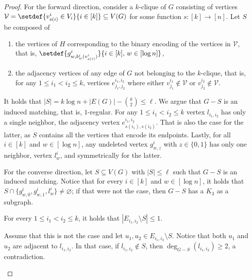 \begin{proof}
    For the forward direction, consider a $k$-clique of $G$ consisting of vertices
    $\mathcal{V} = \setdef{v^i_{s(i)} \in V_i}{i \in [k]} \subseteq V(G)$
    for some function $s \colon [k] \to [n]$.
    Let $S$ be composed of
    \begin{enumerate}
        \item the vertices of $H$ corresponding
        to the binary encoding of the vertices in $\mathcal{V}$,
        that is, $\setdef{g^i_{w,b^i_w(v^i_{s(i)})}}{i \in [k], \, w \in [\log n]}$,
        \item the adjacency vertices of any edge of $G$ not belonging to the $k$-clique,
        that is, for any $1 \le i_1 < i_2 \le k$,
        vertices $e^{i_1,i_2}_{j_1,j_2}$ where either $v^{i_1}_{j_1} \notin \mathcal{V}$ or $v^{i_2}_{j_2} \notin \mathcal{V}$.
    \end{enumerate}
    It holds that $|S| = k \log n + |E(G)| - \binom{k}{2} \le \ell$.
    We argue that $G-S$ is an induced matching,
    that is, $1$-regular.
    For any $1 \le i_1 < i_2 \le k$ vertex $l_{i_1,i_2}$ has only a single neighbor,
    the adjacency vertex $e^{i_1,i_2}_{s(i_1),s(i_2)}$.
    That is also the case for the latter, as $S$ contains all the vertices that encode its endpoints.
    Lastly, for all $i \in [k]$ and $w \in [\log n]$,
    any undeleted vertex $g^i_{w,z}$ with $z \in \{ 0,1 \}$ has only one neighbor,
    vertex $l^i_w$, and symmetrically for the latter.

    For the converse direction, let $S \subseteq V(G)$ with $|S| \le \ell$ such that $G-S$ is an induced matching.
    Notice that for every $i \in [k]$ and $w \in [\log n]$,
    it holds that $S \cap \{ g^i_{w,0}, g^i_{w,1}, l^i_w \} \neq \varnothing$;
    if that were not the case, then $G-S$ has a $K_3$ as a subgraph.

    \begin{claim}
        For every $1 \le i_1 < i_2 \le k$, it holds that $|E_{i_1,i_2} \setminus S| \le 1$.
    \end{claim}

    \begin{claimproof}
        Assume that this is not the case and let $u_1, u_2 \in E_{i_1,i_2} \setminus S$.
        Notice that both $u_1$ and $u_2$ are adjacent to $l_{i_1,i_2}$.
        In that case, if $l_{i_1,i_2} \notin S$, then $\deg_{G-S} (l_{i_1,i_2}) \ge 2$,
        a contradiction.
    \end{claimproof}
\end{proof}